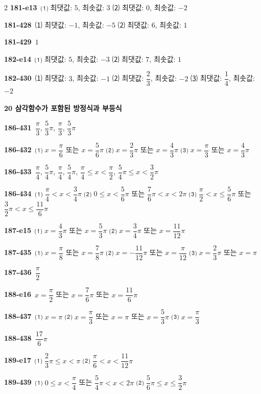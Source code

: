 \documentclass[10pt,a4paper]{article}
\begin{document}
\begin{multicols}{2}
\noindent\textbf{181-e13}\ ⑴ 최댓값: $5$, 최솟값: $3$ ⑵ 최댓값: $0$, 최솟값: $-2$\par
\noindent\textbf{181-428}\ ⑴ 최댓값: $-1$, 최솟값: $-5$ ⑵ 최댓값: $6$, 최솟값: $1$\par
\noindent\textbf{181-429}\ $1$\par
\noindent\textbf{182-e14}\ ⑴ 최댓값: $5$, 최솟값: $-3$ ⑵ 최댓값: $7$, 최솟값: $1$\par
\noindent\textbf{182-430}\ ⑴ 최댓값: $3$, 최솟값: $-1$ ⑵ 최댓값: $\dfrac{2}{3}$, 최솟값: $-2$ ⑶ 최댓값: $\dfrac{1}{4}$, 최솟값: $-2$\par
\noindent\textbf{20 삼각함수가 포함된 방정식과 부등식}\par\smallskip
\noindent\textbf{186-431}\ $\dfrac{\pi}{3}$, $\dfrac{5}{3}\pi$, $\dfrac{\pi}{3}$, $\dfrac{5}{3}\pi$\par
\noindent\textbf{186-432}\ ⑴ $x=\dfrac{\pi}{6}$ 또는 $x=\dfrac{5}{6}\pi$ ⑵ $x=\dfrac{2}{3}\pi$ 또는 $x=\dfrac{4}{3}\pi$ ⑶ $x=\dfrac{\pi}{3}$ 또는 $x=\dfrac{4}{3}\pi$\par
\noindent\textbf{186-433}\ $\dfrac{\pi}{4}$, $\dfrac{5}{4}\pi$, $\dfrac{\pi}{4}$, $\dfrac{5}{4}\pi$, $\dfrac{\pi}{4}\le x<\dfrac{\pi}{2}$, $\dfrac{5}{4}\pi\le x<\dfrac{3}{2}\pi$\par
\noindent\textbf{186-434}\ ⑴ $\dfrac{\pi}{4}<x<\dfrac{3}{4}\pi$ ⑵ $0\le x<\dfrac{5}{6}\pi$ 또는 $\dfrac{7}{6}\pi<x<2\pi$ ⑶ $\dfrac{\pi}{2}<x\le\dfrac{5}{6}\pi$ 또는 $\dfrac{3}{2}\pi<x\le\dfrac{11}{6}\pi$\par
\noindent\textbf{187-e15}\ ⑴ $x=\dfrac{4}{3}\pi$ 또는 $x=\dfrac{5}{3}\pi$ ⑵ $x=\dfrac{3}{4}\pi$ 또는 $x=\dfrac{11}{12}\pi$\par
\noindent\textbf{187-435}\ ⑴ $x=\dfrac{\pi}{8}$ 또는 $x=\dfrac{7}{8}\pi$ ⑵ $x=-\dfrac{11}{12}\pi$ 또는 $x=\dfrac{\pi}{12}$ ⑶ $x=\dfrac{2}{3}\pi$ 또는 $x=\pi$\par
\noindent\textbf{187-436}\ $\dfrac{\pi}{2}$\par
\noindent\textbf{188-e16}\ $x=\dfrac{\pi}{2}$ 또는 $x=\dfrac{7}{6}\pi$ 또는 $x=\dfrac{11}{6}\pi$\par
\noindent\textbf{188-437}\ ⑴ $x=\pi$ ⑵ $x=\dfrac{\pi}{3}$ 또는 $x=\pi$ 또는 $x=\dfrac{5}{3}\pi$ ⑶ $x=\dfrac{\pi}{3}$\par
\noindent\textbf{188-438}\ $\dfrac{17}{6}\pi$\par
\noindent\textbf{189-e17}\ ⑴ $\dfrac{2}{3}\pi\le x<\pi$ ⑵ $\dfrac{\pi}{6}<x<\dfrac{11}{12}\pi$\par
\noindent\textbf{189-439}\ ⑴ $0\le x<\dfrac{\pi}{4}$ 또는 $\dfrac{5}{4}\pi<x<2\pi$ ⑵ $\dfrac{5}{6}\pi\le x\le\dfrac{3}{2}\pi$\par

\end{multicols}
\end{document}
